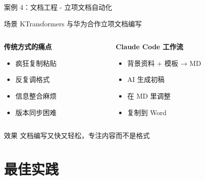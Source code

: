 \documentclass[aspectratio=169,xcolor=dvipsnames]{beamer}
\begin{document}
\begin{frame}{案例 4：文档工程 - 立项文档自动化}
  \begin{block}{场景}
    KTransformers 与华为合作立项文档编写
  \end{block}

  \vspace{0.3cm}

  \begin{columns}
    \begin{column}{0.48\textwidth}
      \textbf{传统方式的痛点}
      \begin{itemize}
        \item 疯狂复制粘贴
        \item 反复调格式
        \item 信息整合麻烦
        \item 版本同步困难
      \end{itemize}
    \end{column}
    \begin{column}{0.48\textwidth}
      \textbf{Claude Code 工作流}
      \begin{itemize}
        \item 背景资料 + 模板 → MD
        \item AI 生成初稿
        \item 在 MD 里调整
        \item 复制到 Word
      \end{itemize}
    \end{column}
  \end{columns}

  \vspace{0.3cm}

  \begin{exampleblock}{效果}
    文档编写又快又轻松，专注内容而不是格式
  \end{exampleblock}
\end{frame}

\section{最佳实践}
\end{document}
